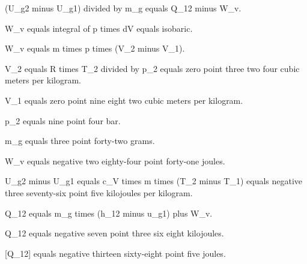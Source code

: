 (U_g2 minus U_g1) divided by m_g equals Q_12 minus W_v.  

W_v equals integral of p times dV equals isobaric.  

W_v equals m times p times (V_2 minus V_1).  

V_2 equals R times T_2 divided by p_2 equals zero point three two four cubic meters per kilogram.  

V_1 equals zero point nine eight two cubic meters per kilogram.  

p_2 equals nine point four bar.  

m_g equals three point forty-two grams.  

W_v equals negative two eighty-four point forty-one joules.  

U_g2 minus U_g1 equals c_V times m times (T_2 minus T_1) equals negative three seventy-six point five kilojoules per kilogram.  

Q_12 equals m_g times (h_12 minus u_g1) plus W_v.  

Q_12 equals negative seven point three six eight kilojoules.  

[Q_12] equals negative thirteen sixty-eight point five joules.